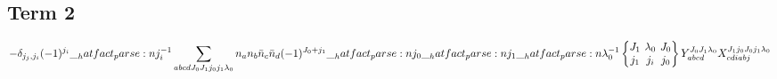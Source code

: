 \documentclass{scrartcl}
\newcommand{\sixj}[6]{\begingroup\setlength{\arraycolsep}{0.2em}\begin{Bmatrix} #1 & #2 & #3 \\ #4 & #5 & #6 \end{Bmatrix}\endgroup}
\begin{document}
\subsection{Term 2}
\begin{dmath*}
-\delta_{{j}_{j},{j}_{i}} \* (-1)^{{j}_{i}} \* \hatfact{{j}_{i}^{-1}} \* \sum_{a b c d {J}_{0} {J}_{1} {j}_{0} {j}_{1} {{\lambda}}_{0}} \* n_{a} \* n_{b} \* \bar{n}_{c} \* \bar{n}_{d} \* (-1)^{{J}_{0}+{j}_{1}} \* \hatfact{{j}_{0}} \* \hatfact{{j}_{1}} \* \hatfact{{{\lambda}}_{0}^{-1}} \* \sixj{{J}_{1}}{{{\lambda}}_{0}}{{J}_{0}}{{j}_{1}}{{j}_{i}}{{j}_{0}} \* Y_{a b c d}^{{J}_{0} {J}_{1} {{\lambda}}_{0}} \* X_{c d i a b j}^{{J}_{1} {j}_{0} {J}_{0} {j}_{1} {{\lambda}}_{0}}
\end{dmath*}
\end{document}
